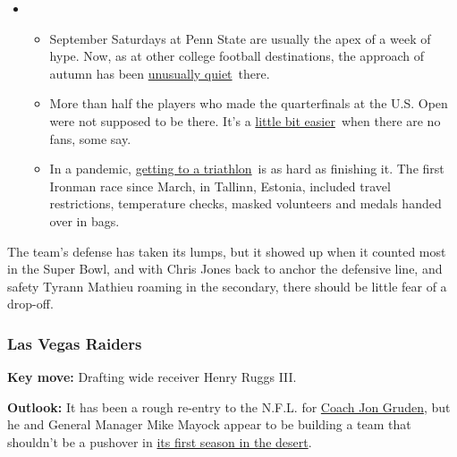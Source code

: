 \begin{itemize}
\item
  \begin{itemize}
  \tightlist
  \item
    September Saturdays at Penn State are usually the apex of a week of
    hype. Now, as at other college football destinations, the approach
    of autumn has been
    \href{https://www.nytimes3xbfgragh.onion/2020/09/09/sports/penn-state-college-football-canceled.html?action=click\&pgtype=Article\&state=default\&region=MAIN_CONTENT_2\&context=storylines_keepup}{unusually
    quiet}~there.
  \item
    More than half the players who made the quarterfinals at the U.S.
    Open were not supposed to be there. It's a
    \href{https://www.nytimes3xbfgragh.onion/2020/09/09/sports/us-open-crowd.html?action=click\&pgtype=Article\&state=default\&region=MAIN_CONTENT_2\&context=storylines_keepup}{little
    bit easier}~when there are no fans, some say.
  \item
    In a pandemic,
    \href{https://www.nytimes3xbfgragh.onion/2020/09/08/sports/ironman-tallinn-triathlon-pandemic.html?action=click\&pgtype=Article\&state=default\&region=MAIN_CONTENT_2\&context=storylines_keepup}{getting
    to a triathlon}~is as hard as finishing it. The first Ironman race
    since March, in Tallinn, Estonia, included travel restrictions,
    temperature checks, masked volunteers and medals handed over in
    bags.
  \end{itemize}
\end{itemize}

The team's defense has taken its lumps, but it showed up when it counted
most in the Super Bowl, and with Chris Jones back to anchor the
defensive line, and safety Tyrann Mathieu roaming in the secondary,
there should be little fear of a drop-off.

\hypertarget{las-vegas-raiders}{%
\subsubsection{\texorpdfstring{\textbf{Las Vegas
Raiders}}{Las Vegas Raiders}}\label{las-vegas-raiders}}

\textbf{Key move:} Drafting wide receiver Henry Ruggs III.

\textbf{Outlook:} It has been a rough re-entry to the N.F.L. for
\href{https://www.nytimes3xbfgragh.onion/2019/09/05/sports/football/antonio-brown-raiders.html}{Coach
Jon Gruden}, but he and General Manager Mike Mayock appear to be
building a team that shouldn't be a pushover in
\href{https://www.nytimes3xbfgragh.onion/2019/12/13/sports/football/oakland-raiders-las-vegas-stadium.html}{its
first season in the desert}.

